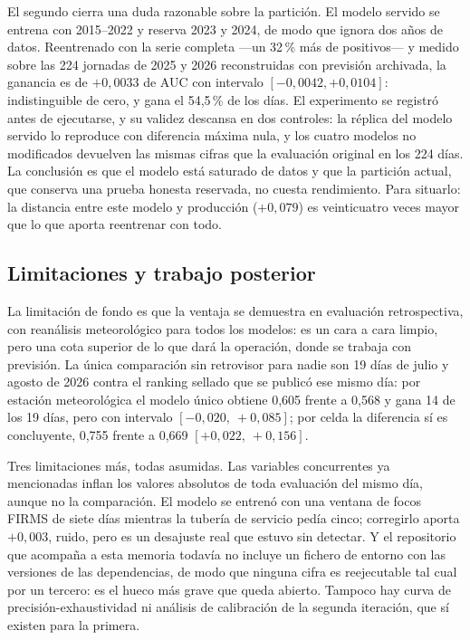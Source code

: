 \documentclass[10pt,a4paper]{article}
\begin{document}
El segundo cierra una duda razonable sobre la partición. El modelo servido se
entrena con 2015--2022 y reserva 2023 y 2024, de modo que ignora dos años de
datos. Reentrenado con la serie completa ---un 32\,\% más de positivos--- y
medido sobre las 224 jornadas de 2025 y 2026 reconstruidas con previsión
archivada, la ganancia es de $+0{,}0033$ de AUC con intervalo
$[-0{,}0042, +0{,}0104]$: indistinguible de cero, y gana el 54,5\,\% de los días.
El experimento se registró antes de ejecutarse, y su validez descansa en dos
controles: la réplica del modelo servido lo reproduce con diferencia máxima nula,
y los cuatro modelos no modificados devuelven las mismas cifras que la
evaluación original en los 224 días. La conclusión es que el modelo está saturado
de datos y que la partición actual, que conserva una prueba honesta reservada,
no cuesta rendimiento. Para situarlo: la distancia entre este modelo y producción
($+0{,}079$) es veinticuatro veces mayor que lo que aporta reentrenar con todo.

\subsection{Limitaciones y trabajo posterior}

La limitación de fondo es que la ventaja se demuestra en evaluación
retrospectiva, con reanálisis meteorológico para todos los modelos: es un cara a
cara limpio, pero una cota superior de lo que dará la operación, donde se trabaja
con previsión. La única comparación sin retrovisor para nadie son 19 días de julio y agosto de 2026 contra el ranking sellado
que se publicó ese mismo día: por estación meteorológica el modelo único obtiene
0,605 frente a 0,568 y gana 14 de los 19 días, pero con intervalo
$[-0,020,\ +0,085]$; por celda la diferencia sí es concluyente, 0,755 frente a
0,669 $[+0,022,\ +0,156]$.

Tres limitaciones más, todas asumidas. Las variables concurrentes ya mencionadas
inflan los valores absolutos de toda evaluación del mismo día, aunque no la
comparación. El modelo se entrenó con una ventana de focos FIRMS de siete días
mientras la tubería de servicio pedía cinco; corregirlo aporta $+0,003$, ruido,
pero es un desajuste real que estuvo sin detectar. Y el repositorio que acompaña
a esta memoria todavía no incluye un fichero de entorno con las versiones de las
dependencias, de modo que ninguna cifra es reejecutable tal cual por un tercero:
es el hueco más grave que queda abierto. Tampoco hay curva de
precisión-exhaustividad ni análisis de calibración de la segunda iteración, que
sí existen para la primera.
\end{document}
